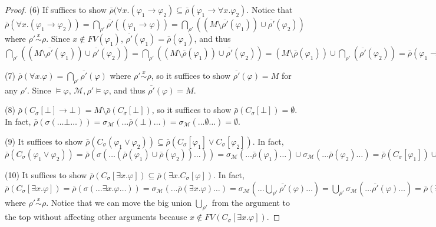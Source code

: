 \documentclass[acmsmall]{acmart}
\theoremstyle{acmdefinition}
\newcommand{\imp}{\to}
\newcommand{\MM}{\mathcal{M}}
\newcommand{\sigmaM}{{\sigma_{\MM}}}
\newcommand{\widebar}[1]{\overline{#1}}
\newcommand{\rhop}{\rho'}
\newcommand{\barrho}{\bar{\rho}}
\newcommand{\barrhop}{\widebar{\rhop}}
\newcommand{\simon}[1]{\overset{#1}{\sim}}
\newcommand{\CSub}[1]{C_{#1}}
\newcommand{\Csigmaapp}[1]{\CSub{\sigma}[#1]}
\newcommand{\fv}{\mathit{FV}}
\newcommand{\FV}{\fv}
\newcommand{\ddd}{,\dots,}
\begin{document}
\begin{proof}
	(6)
	If suffices to show
	$\barrho(\forall x . (\varphi_1 \imp \varphi_2)
	\subseteq
	\barrho(\varphi_1 \imp \forall x . \varphi_2).
	$
	Notice that
	$\barrho(\forall x . (\varphi_1 \imp \varphi_2))
	= \bigcap_{\rhop}\barrhop((\varphi_1 \imp \varphi))
	= \bigcap_{\rhop}((M \setminus \barrhop(\varphi_1)) \cup 
	\barrhop(\varphi_2))
	$
	where $\rhop \simon{x} \rho$.
	Since $x \not\in \FV(\varphi_1)$,
	$\barrhop(\varphi_1) = \barrho(\varphi_1)$,
	and thus
	$\bigcap_{\rhop}((M \setminus \barrhop(\varphi_1)) \cup \barrhop(\varphi_2))
	= \bigcap_{\rhop}((M \setminus \barrho(\varphi_1)) \cup \barrhop(\varphi_2))
	= (M \setminus \barrho(\varphi_1)) \cup \bigcap_{\rhop}(\barrhop(\varphi_2))
	= \barrho(\varphi_1 \imp \forall x . \varphi_2).
	$
	
	
	
	(7)
	$\barrho(\forall x . \varphi)
	= \bigcap_{\rhop} \barrhop(\varphi)
	$
	where $\rhop \simon{x} \rho$,
	so it suffices to show $\barrhop(\varphi) = M$ for any $\rhop$.
	Since $\vDash \varphi$, $\MM,\rhop \vDash \varphi$, and thus
	$\barrhop(\varphi) = M$.
	
	
	(8)
	$\barrho(\CSub{\sigma}[\bot] \imp \bot)
	= M \setminus \barrho(\CSub{\sigma}[\bot])
	$,
	so it suffices to show $\barrho(\CSub{\sigma}[\bot]) = \emptyset$.
	In fact,
	$\barrho(\sigma(\dots \bot \dots))
	= \sigmaM(\dots \barrho(\bot) \dots)
	= \sigmaM(\dots \emptyset \dots)
	= \emptyset.
	$
	
	(9)
	It suffices to show
	$\barrho(\CSub{\sigma}(\varphi_1 \vee \varphi_2))
	\subseteq
	\barrho(\CSub{\sigma}[ \varphi_1 ]
	\vee
	\CSub{\sigma}[ \varphi_2 ])$.
	In fact,
	$\barrho(\CSub{\sigma}(\varphi_1 \vee \varphi_2))
	= \barrho(\sigma(\dots (\barrho(\varphi_1) \cup \barrho(\varphi_2)) \dots))
	= \sigmaM(\dots \barrho(\varphi_1) \dots)
	\cup
	\sigmaM(\dots \barrho(\varphi_2) \dots)
	= \barrho(\CSub{\sigma}[ \varphi_1 ])
	\cup
	\barrho(\CSub{\sigma}[ \varphi_2 ])
	= \barrho(\CSub{\sigma}[ \varphi_1 ]
	\vee
	\CSub{\sigma}[ \varphi_2 ]).
	$
	
	(10)
	It suffices to show
	$\barrho(\CSub{\sigma}[\exists x . \varphi])
	\subseteq
	\barrho(\exists x . \CSub{\sigma}[\varphi])$.
	In fact,
	$
	\barrho(\CSub{\sigma}[\exists x . \varphi])
	= \barrho(\sigma(\dots \exists x . \varphi \dots))
	= \sigmaM(\dots \barrho(\exists x. \varphi) \dots)
	= \sigmaM(\ldots \bigcup_{\rhop}\barrhop(\varphi) \dots)
	= \bigcup_{\rhop} \sigmaM(\dots \barrhop(\varphi) \dots)
	= \barrho(\exists x . \CSub{\sigma}[\varphi])
	$
	where $\rhop \simon{x} \rho$.
	Notice that we can move the big union $\bigcup_{\rhop}$ from the argument
	to the top without affecting other arguments because
	$x \not\in \FV(\Csigmaapp{\exists x . \varphi})$.
	

\end{proof}
\end{document}
